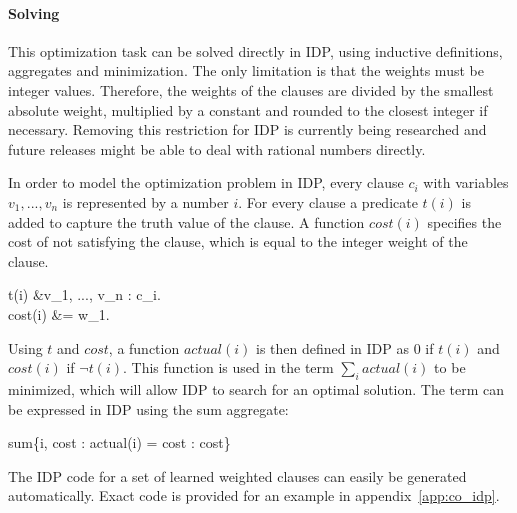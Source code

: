 \paragraph{Solving}
This optimization task can be solved directly in IDP, using inductive definitions, aggregates and minimization.
The only limitation is that the weights must be integer values.
Therefore, the weights of the clauses are divided by the smallest absolute weight, multiplied by a constant and rounded to the closest integer if necessary.
Removing this restriction for IDP is currently being researched and future releases might be able to deal with rational numbers directly.

In order to model the optimization problem in IDP, every clause $c_i$ with variables $v_1, ..., v_n$ is represented by a number $i$. For every clause a predicate $t(i)$ is added to capture the truth value of the clause.
A function $\mathit{cost}(i)$ specifies the cost of not satisfying the clause, which is equal to the integer weight of the clause.
\begin{shiftedflalign*}
	t(i) &\Leftrightarrow \forall v_1, ..., v_n : c_i. \\
	cost(i) &= w_1.
\end{shiftedflalign*}

Using $t$ and $\mathit{cost}$, a function $\mathit{actual}(i)$ is then defined in IDP as 0 if $t(i)$ and $\mathit{cost}(i)$ if $\lnot t(i)$.
This function is used in the term $\sum_i actual(i)$ to be minimized, which will allow IDP to search for an optimal solution.
The term can be expressed in IDP using the sum aggregate:
\begin{shiftedflalign*}
	sum\{i, cost : actual(i) = cost : cost\}
\end{shiftedflalign*}

The IDP code for a set of learned weighted clauses can easily be generated automatically.
Exact code is provided for an example in appendix~\ref{app:co_idp}.